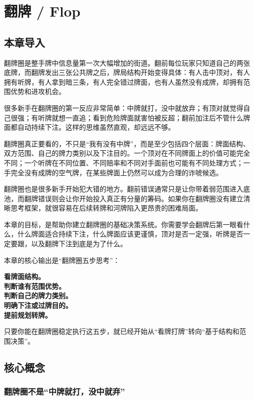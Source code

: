 \chapter{翻牌 / Flop}

\section{本章导入}

翻牌圈是整手牌中信息量第一次大幅增加的街道。翻前每位玩家只知道自己的两张底牌，而翻牌发出三张公共牌之后，牌局结构开始变得具体：有人击中顶对，有人拥有听牌，有人拿到暗三条，有人完全错过牌面，也有人虽然没有成牌，却拥有范围优势和进攻机会。

很多新手在翻牌圈的第一反应非常简单：中牌就打，没中就放弃；有顶对就觉得自己很强；有听牌就想一直追；看到危险牌面就害怕被反超；翻前加注后不管什么牌面都自动持续下注。这样的思维虽然直观，却远远不够。

翻牌圈真正要看的，不只是“我有没有中牌”，而是至少包括四个层面：牌面结构、双方范围、自己的牌力类别以及下注目的。一个顶对在不同牌面上的价值可能完全不同；一个听牌在不同位置、不同赔率和不同对手面前也可能有不同处理方式；一手完全没有成牌的空气牌，在某些牌面上仍然可以成为合理的诈唬候选。

翻牌圈也是很多新手开始犯大错的地方。翻前错误通常只是让你带着弱范围进入底池，而翻牌错误则会让你开始投入真正有分量的筹码。如果你在翻牌圈没有建立清晰思考框架，就很容易在后续转牌和河牌陷入更昂贵的困难局面。

本章的目标，是帮助你建立翻牌圈的基础决策系统。你需要学会翻牌后第一眼看什么，什么牌面适合持续下注，什么牌面应该更谨慎，顶对是否一定强，听牌是否一定要跟，以及翻牌下注到底是为了什么。

本章的核心输出是“翻牌圈五步思考”：

\begin{center}
\textbf{看牌面结构。\\
判断谁有范围优势。\\
判断自己的牌力类别。\\
明确下注或过牌目的。\\
提前规划转牌。}
\end{center}

只要你能在翻牌圈稳定执行这五步，就已经开始从“看牌打牌”转向“基于结构和范围决策”。

\section{核心概念}

\subsection{翻牌圈不是“中牌就打，没中就弃”}

